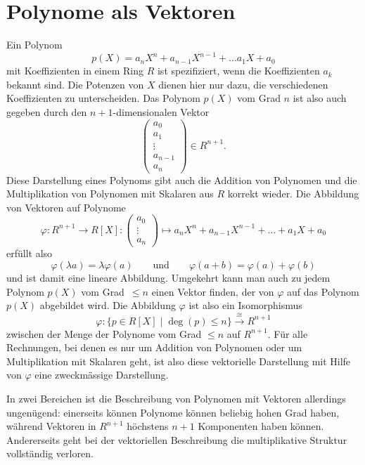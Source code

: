 %
%
%
\section{Polynome als Vektoren
\label{buch:section:polynome:vektoren}}
Ein Polynom
\[
p(X) = a_nX^n + a_{n-1}X^{n-1} + \dots a_1X+a_0
\]
mit Koeffizienten in einem Ring $R$
ist spezifiziert, wenn die Koeffizienten $a_k$ bekannt sind.
Die Potenzen von $X$ dienen hier nur dazu, die verschiedenen
Koeffizienten zu unterscheiden.
Das Polynom $p(X)$ vom Grad $n$ ist also auch gegeben durch den
$n+1$-dimensionalen Vektor
\[
\begin{pmatrix}
a_0\\
a_1\\
\vdots\\
a_{n-1}\\
a_{n}
\end{pmatrix}
\in
R^{n+1}.
\]
Diese Darstellung eines Polynoms gibt auch die Addition von Polynomen
und die Multiplikation von Polynomen mit Skalaren aus $R$ korrekt wieder.
Die Abbildung von Vektoren auf Polynome
\[
\varphi
\colon  R^{n+1} \to R[X]
:
\begin{pmatrix}a_0\\\vdots\\a_n\end{pmatrix}
\mapsto
a_nX^n + a_{n-1}X^{n-1}+\dots+a_1X+a_0
\]
erfüllt also
\[
\varphi( \lambda a) = \lambda \varphi(a)
\qquad\text{und}\qquad
\varphi(a+b) = \varphi(a) + \varphi(b)
\]
und ist damit eine lineare Abbildung.
Umgekehrt kann man auch zu jedem Polynom $p(X)$ vom Grad~$\le n$ einen
Vektor finden, der von $\varphi$ auf das Polynom $p(X)$ abgebildet wird.
Die Abbildung $\varphi$ ist also ein Isomorphismus
\[
\varphi
\colon
\{p\in R[X]\;|\; \deg(p) \le n\}
\overset{\cong}{\to}
R^{n+1}
\]
zwischen der Menge
der Polynome vom Grad $\le n$ auf $R^{n+1}$.
Für alle Rechnungen, bei denen es nur um Addition von Polynomen oder
um Multiplikation mit Skalaren geht, ist also diese vektorielle Darstellung
mit Hilfe von $\varphi$ eine zweckmässige Darstellung.

In zwei Bereichen ist die Beschreibung von Polynomen mit Vektoren allerdings
ungenügend: einerseits können Polynome können beliebig hohen Grad haben,
während Vektoren in $R^{n+1}$ höchstens $n+1$ Komponenten haben können.
Andererseits geht bei der vektoriellen Beschreibung die multiplikative
Struktur vollständig verloren.

